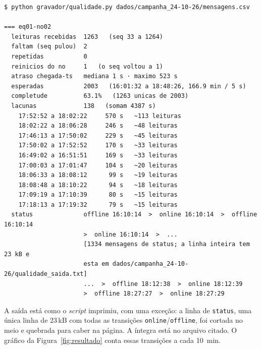 \begin{lstlisting}[style=terminal,
  caption={Saída do \texttt{qualidade.py} sobre o arquivo final da campanha},
  label={lst:qualidade}]
$ python gravador/qualidade.py dados/campanha_24-10-26/mensagens.csv

=== eq01-no02
  leituras recebidas  1263   (seq 33 a 1264)
  faltam (seq pulou)  2
  repetidas           0
  reinicios do no     1   (o seq voltou a 1)
  atraso chegada-ts   mediana 1 s · maximo 523 s
  esperadas           2003   (16:01:32 a 18:48:26, 166.9 min / 5 s)
  completude          63.1%   (1263 unicas de 2003)
  lacunas             138   (somam 4387 s)
    17:52:52 a 18:02:22     570 s   ~113 leituras
    18:02:22 a 18:06:28     246 s   ~48 leituras
    17:46:13 a 17:50:02     229 s   ~45 leituras
    17:50:02 a 17:52:52     170 s   ~33 leituras
    16:49:02 a 16:51:51     169 s   ~33 leituras
    17:00:03 a 17:01:47     104 s   ~20 leituras
    18:06:33 a 18:08:12      99 s   ~19 leituras
    18:08:48 a 18:10:22      94 s   ~18 leituras
    17:09:19 a 17:10:39      80 s   ~15 leituras
    17:18:13 a 17:19:32      79 s   ~15 leituras
  status              offline 16:10:14  >  online 16:10:14  >  offline 16:10:14
                      >  online 16:10:14  >  ...
                      [1334 mensagens de status; a linha inteira tem 23 kB e
                      esta em dados/campanha_24-10-26/qualidade_saida.txt]
                      ...  >  offline 18:12:38  >  online 18:12:39
                      >  offline 18:27:27  >  online 18:27:29
\end{lstlisting}

\noindent A saída está como o \emph{script} imprimiu, com uma exceção: a
linha de \texttt{status}, uma única linha de 23\,kB com todas as
transições \texttt{online}/\texttt{offline}, foi cortada no meio e
quebrada para caber na página. A íntegra está no arquivo citado. O
gráfico da Figura~\ref{fig:resultado} conta essas transições a cada
\SI{10}{\minute}.
